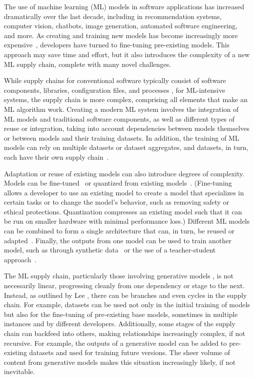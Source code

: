 
The use of machine learning (ML) models in software applications has increased dramatically over the last decade, including in recommendation systems, computer vision, chatbots, image generation, automated software engineering, and more. As creating and training new models has become increasingly more expensive~\cite{patterson_carbon_2021}, developers have turned to fine-tuning pre-existing models.  This approach may save time and effort, but it also introduces the complexity of a new ML supply chain, complete with many novel challenges.

While supply chains for conventional software typically consist of software components, libraries, configuration files, and processes \cite{tan2022exploratory,GaoHXZ24}, %
for ML-intensive systems, the supply chain is more complex, comprising all elements that make an ML algorithm work. Creating a modern ML system involves the integration of ML models and traditional software components, as well as different types of reuse or integration, taking into account dependencies between models themselves or between models and their training datasets. In addition, the training of ML models can rely on multiple datasets or dataset aggregates, and datasets, in turn, each have their own supply chain~\cite{lee2023talkin}. 

Adaptation or reuse of existing models can also introduce degrees of complexity. Models can be fine-tuned~\cite{church2021emerging} or quantized from existing models~\cite{gholami2022survey}. %
(Fine-tuning allows a developer to use an existing model to create a model that specializes in certain tasks or to change the model's behavior, such as removing safety or ethical protections. Quantization compresses an existing model such that it can be run on smaller hardware with minimal performance loss.)  Different ML models can be combined to form a single architecture that can, in turn, be reused or adapted~\cite{ardabili2019advances}. Finally, the outputs from one model can be used to train another model, such as through synthetic data~\cite{marwala2023use} or the use of a teacher-student approach~\cite{hinton2015distilling}.

The ML supply chain, particularly those involving generative models \cite{lee2023talkin}, is not necessarily linear, progressing cleanly from one dependency or stage to the next.  Instead, as outlined by Lee \etal  \cite{lee2023talkin}, there can be branches and even cycles in the supply chain. %
For example, datasets can be used not only in the initial training of models but also for the fine-tuning of pre-existing base models, sometimes in multiple instances and by different developers. Additionally, some stages of the supply chain can backfeed into others, making relationships increasingly complex, if not recursive.  For example, the outputs of a generative model can be added to pre-existing datasets and used for training future versions.  The sheer volume of content from generative models makes this situation increasingly likely, if not inevitable. 


